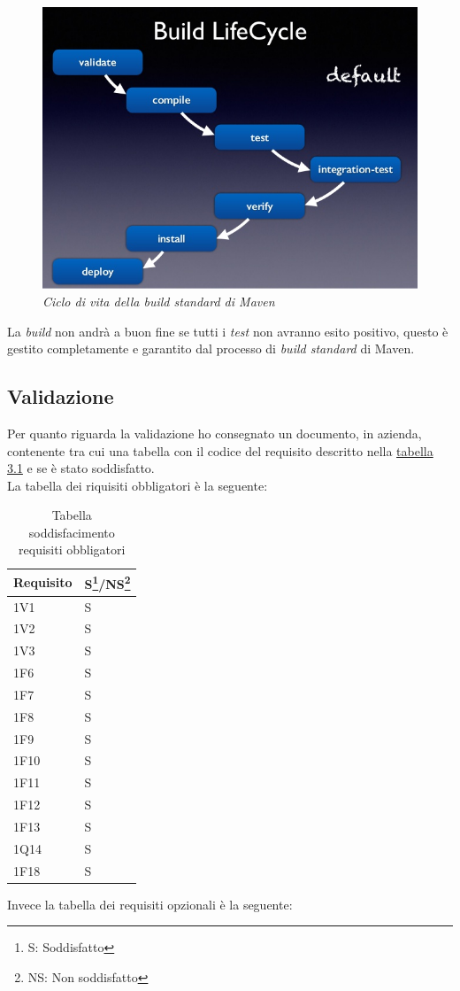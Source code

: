 \begin{figure}[!ht]
	\centering
	\includegraphics[scale=0.4]{immagini/build.jpg}
	\caption{\textit{Ciclo di vita della build standard di Maven }}
\end{figure}

La \textit{build} non andrà a buon fine se tutti i \textit{test} non avranno esito positivo, questo è gestito completamente e garantito dal processo di \textit{build standard} di Maven.
\subsection{Validazione}
\label{sec:valid}
Per quanto riguarda la validazione ho consegnato un documento, in azienda, contenente tra cui una tabella con il codice del requisito descritto nella \hyperlink{tab:rec}{tabella 3.1} e se è stato soddisfatto.\\
La tabella dei riquisiti obbligatori è la seguente:

\label{tab:pian}
\begin{table}[!ht]
\begin{tabularx}{.35\textwidth}{XX}
\hline\hline
\textbf{Requisito} & \textbf{S\footnote{S: Soddisfatto}/NS\footnote{NS: Non soddisfatto}} \\
\hline
1V1 & S\\
\hline
1V2 & S\\
\hline
1V3 & S\\
\hline
1F6 & S\\
\hline
1F7 & S\\
\hline
1F8 & S\\
\hline
1F9 & S\\
\hline
1F10 & S\\
\hline
1F11 & S\\
\hline
1F12 & S\\
\hline
1F13 & S\\
\hline
1Q14 & S\\
\hline
1F18 & S\\
\hline
\end{tabularx}
 \captionsetup{singlelinecheck = false, format= hang, justification=raggedright}
\caption{Tabella soddisfacimento requisiti obbligatori}
\end{table}%
\newpage
Invece la tabella dei requisiti opzionali è la seguente:


